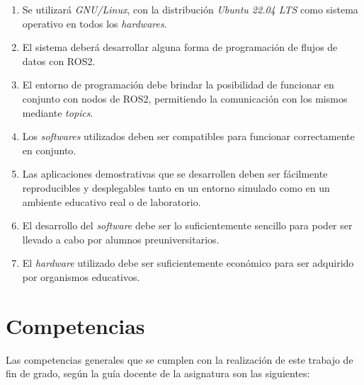 \begin{enumerate}
    \item{Se utilizará \textit{GNU/Linux}, con la distribución
        \textit{Ubuntu 22.04 LTS} como sistema operativo en todos los
        \textit{hardwares}.}
    \item{El sistema deberá desarrollar alguna forma de programación de flujos
        de datos con ROS2.}
    \item{El entorno de programación debe brindar la posibilidad de funcionar en
        conjunto con nodos de ROS2, permitiendo la comunicación con los mismos
        mediante \textit{topics}.}
    \item{Los \textit{softwares} utilizados deben ser compatibles para funcionar
        correctamente en conjunto.}
    \item{Las aplicaciones demostrativas que se desarrollen deben ser fácilmente
        reproducibles y desplegables tanto en un entorno simulado como en un
        ambiente educativo real o de laboratorio.}
    \item{El desarrollo del \textit{software} debe ser lo suficientemente
        sencillo para poder ser llevado a cabo por alumnos preuniversitarios.}
    \item{El \textit{hardware} utilizado debe ser suficientemente económico para
        ser adquirido por organismos educativos.}
\end{enumerate}



\section{Competencias}
\label{sec:requisitos}

Las competencias generales que se cumplen con la realización de este trabajo de
fin de grado, según la guía docente de la asignatura son las siguientes:

